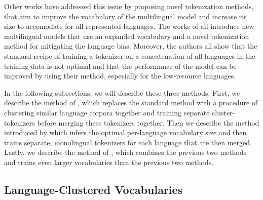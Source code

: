 Other works have addressed this issue by proposing novel tokenization methods, that aim to improve the vocabulary of the multilingual model and increase its size to accomodate for all represented languages. The works of \citet{chung_improving_2020,zheng_allocating_2021,liang_xlm-v_2023} all introduce new multilingual models that use an expanded vocabulary and a novel tokenization method for mitigating the language bias. Moreover, the authors all show that the standard recipe of training a tokenizer on a concatenation of all languages in the training data is not optimal and that the performance of the model can be improved by using their method, especially for the low-resource languages.

In the following subsections, we will describe these three methods. First, we describe the method of \citet{chung_improving_2020}, which replaces the standard method with a procedure of clustering similar language corpora together and training separate cluster-tokenizers before merging these tokenizers together. Then we describe the method introduced by \citet{zheng_allocating_2021} which infers the optimal per-language vocabulary size and then trains separate, monolingual tokenizers for each language that are then merged. Lastly, we describe the method of \citet{liang_xlm-v_2023}, which combines the previous two methods and trains even larger vocabularies than the previous two methods.



\subsection{Language-Clustered Vocabularies}

